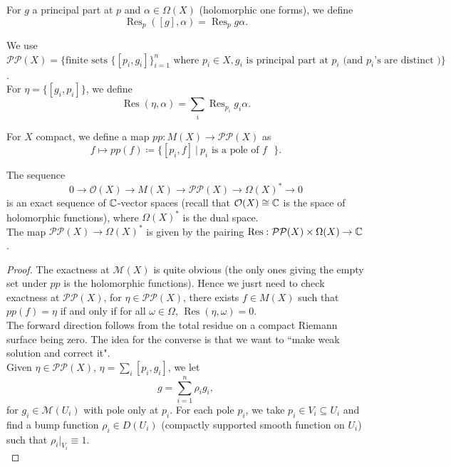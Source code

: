 \documentclass{article}
\begin{document}
{\begin{definition}
    For $g$ a principal part at $p$ and $\alpha \in \Omega(X)$ (holomorphic one forms), we define
    \[\operatorname{Res}_p([g], \alpha) = \operatorname{Res}_p g\alpha.\]

    We use $\mathcal{P} \mathcal{P}(X) = \{\text{finite sets } \{[p_i, g_i]\}_{i = 1}^n \text{ where } p_i \in X, g_i \text{ is principal part at } p_i \text{ (and $p_i$'s are distinct })\}$.\\

    For $\eta = \{[g_i, p_i]\}$, we define
    \[\operatorname{Res}(\eta, \alpha) = \sum_i \operatorname{Res}_{p_i} g_i \alpha.\]
\end{definition}

For $X$ compact, we define a map $pp: M(X) \to \mathcal{P} \mathcal{P}(X)$ as
\[f \mapsto pp(f) \coloneqq \{[p_i, f]\ |\ p_i \text{ is a pole of $f$ }\}.\]

\begin{theorem}
    The sequence 
    \[0 \to \mathcal{O}(X) \to M(X) \to \mathcal{P} \mathcal{P}(X) \to \Omega(X)^* \to 0\]
    is an exact sequence of $\mathbb{C}$-vector spaces (recall that $\mathcal{O}(X) \cong \mathbb{C}$ is the space of holomorphic functions), where $\Omega(X)^*$ is the dual space.\\

    The map $\mathcal{P} \mathcal{P}(X) \to \Omega(X)^*$ is given by the pairing $\operatorname{Res}: \mathcal{P} \mathcal{P}(X) \times \Omega(X) \to \mathbb{C}$.
\end{theorem}


\begin{proof}
    The exactness at $\mathcal{M}(X)$ is quite obvious (the only ones giving the empty set under $pp$ is the holomorphic functions). Hence we jusrt need to check exactness at $\mathcal{P} \mathcal{P}(X)$, for $\eta \in \mathcal{P} \mathcal{P}(X)$, there exists $f \in M(X)$ such that $pp(f) = \eta$ if and only if for all $\omega \in \Omega$, $\operatorname{Res}(\eta, \omega) = 0$.\\

   The forward direction follows from the total residue on a compact Riemann surface being zero. The idea for the converse is that we want to ``make weak solution and correct it".\\

    Given $\eta \in \mathcal{P} \mathcal{P}(X)$, $\eta = \sum_i [p_i, g_i]$, we let $$ g = \sum_{i = 1}^n \rho_i g_i, $$
    for $g_i \in \mathcal{M}(U_i)$ with pole only at $p_i$. For each pole $p_i$, we take $p_i \in V_i \subseteq U_i$ and find a bump function $\rho_i \in D(U_i)$ (compactly supported smooth function on $U_i$) such that $\rho_i|_{V_i} \equiv 1$.\\


\end{proof}}
\end{document}
